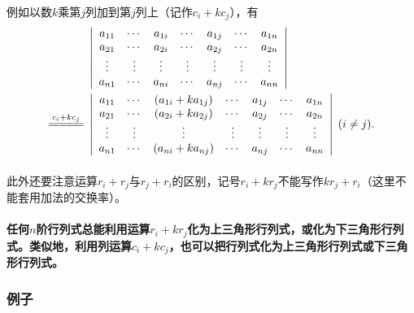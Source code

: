 \paragraph{}
例如以数$k$乘第$j$列加到第$j$列上（记作$c_i+kc_j$），有
\begin{align*}
  &\;\left|\begin{array}{ccccccc}
    a_{11} & \cdots & a_{1i} & \cdots & a_{1j} & \cdots & a_{1n} \\
    a_{21} & \cdots & a_{2i} & \cdots & a_{2j} & \cdots & a_{2n} \\
    \vdots & \vdots & \vdots & \vdots & \vdots & \vdots & \vdots \\
    a_{n1} & \cdots & a_{ni} & \cdots & a_{nj} & \cdots & a_{nn}
  \end{array}\right| \\
  \stackrel{c_i+kc_j}{=\joinrel=\joinrel=\joinrel=\joinrel=} &\;\left|\begin{array}{ccccccc}
    a_{11} & \cdots & (a_{1i} + ka_{1j}) & \cdots & a_{1j} & \cdots & a_{1n} \\
    a_{21} & \cdots & (a_{2i} + ka_{2j}) & \cdots & a_{2j} & \cdots & a_{2n} \\
    \vdots & \vdots & \vdots & \vdots & \vdots & \vdots & \vdots \\
    a_{n1} & \cdots & (a_{ni} + ka_{nj}) & \cdots & a_{nj} & \cdots & a_{nn}
  \end{array}\right| \; (i \neq j).
\end{align*}

\paragraph{}
此外还要注意运算$r_i + r_j$与$r_j + r_i$的区别，记号$r_i + kr_j$不能写作$kr_j + r_i$（这里不能套用加法的交换率）。

\paragraph{}
\hypertarget{行列式性质6的结论}{}
\textbf{任何$n$阶行列式总能利用运算$r_i+kr_j$化为上三角形行列式，或化为下三角形行列式。类似地，利用列运算$c_i+kc_j$，也可以把行列式化为上三角形行列式或下三角形行列式。}

\subsubsection{例子}\label{行列式性质的例子}
